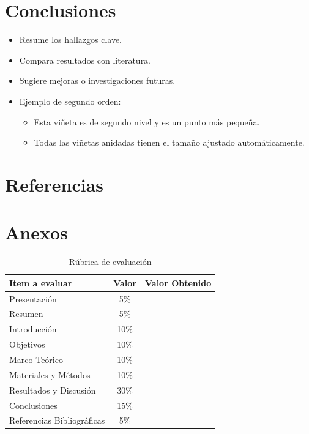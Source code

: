 \documentclass[letterpaper,12pt]{article}
\numberwithin{equation}{section}
\begin{document}
	\section{Conclusiones}
	\begin{itemize}
		\item Resume los hallazgos clave.
		\item Compara resultados con literatura.
		\item Sugiere mejoras o investigaciones futuras.
		\item Ejemplo de segundo orden:
		\begin{itemize}
			\item Esta viñeta es de segundo nivel y es un punto más pequeña.
			\item Todas las viñetas anidadas tienen el tamaño ajustado automáticamente.
		\end{itemize}
	\end{itemize}
	
	\section{Referencias}
	\printbibliography
	
	\newpage
	\section{Anexos}
	
	\begin{table}[H]
		\centering
		\begin{tabular}{|l|c|c|}
			\hline
			\textbf{Item a evaluar} & \textbf{Valor} & \textbf{Valor Obtenido} \\
			\hline
			Presentación & 5\% & \\
			\hline
			Resumen & 5\% & \\
			\hline
			Introducción & 10\% & \\
			\hline
			Objetivos & 10\% & \\
			\hline
			Marco Teórico & 10\% & \\
			\hline
			Materiales y Métodos & 10\% & \\
			\hline
			Resultados y Discusión & 30\% & \\
			\hline
			Conclusiones & 15\% & \\
			\hline
			Referencias Bibliográficas & 5\% & \\
			\hline
		\end{tabular}
		\caption{Rúbrica de evaluación}
	\end{table}
	
\end{document}
